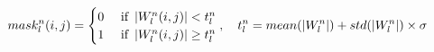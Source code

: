 \documentclass{article}
\begin{document}


\begin{equation}
\vspace{-2mm}
mask_{l}^{n}(i,j) = \begin{cases}
0 & \text{ if } \left | W_{l}^{n}(i,j) \right|   <   t_{l}^{n} \\ 
1 & \text{ if } \left | W_{l}^{n}(i,j) \right|  \geq  t_{l}^{n}
\end{cases}
\label{eq:mask}
, \quad  t_{l}^{n} = mean(|W_{l}^{n}|) + std(|W_{l}^{n}|)\times \sigma
\vspace{-2mm}
\end{equation}
\end{document}
